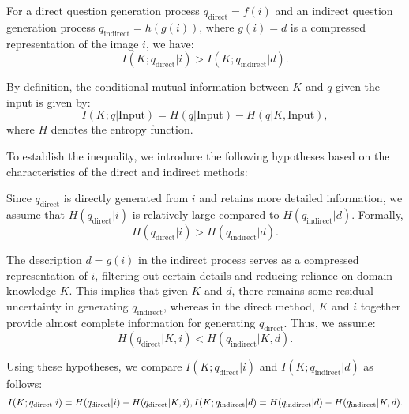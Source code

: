 \begin{lemma}
\label{lem:lemma1}
For a direct question generation process \( q_{\text{direct}} = f(i) \) and an indirect question generation process \( q_{\text{indirect}} = h(g(i)) \), where \( g(i) = d \) is a compressed representation of the image \( i \), we have:
\begin{equation}
I(K; q_{\text{direct}} | i) > I(K; q_{\text{indirect}} | d).
\end{equation}

By definition, the conditional mutual information between \( K \) and \( q \) given the input is given by:
\begin{equation}
I(K; q | \text{Input}) = H(q | \text{Input}) - H(q | K, \text{Input}),
\end{equation}
where \( H \) denotes the entropy function.

To establish the inequality, we introduce the following hypotheses based on the characteristics of the direct and indirect methods:

\begin{hypothesis1} Since \( q_{\text{direct}} \) is directly generated from \( i \) and retains more detailed information, we assume that \( H(q_{\text{direct}} | i) \) is relatively large compared to \( H(q_{\text{indirect}} | d) \). Formally,
\begin{equation}
   H(q_{\text{direct}} | i) > H(q_{\text{indirect}} | d).
\end{equation}
\end{hypothesis1}

\begin{hypothesis1}
 The description \( d = g(i) \) in the indirect process serves as a compressed representation of \( i \), filtering out certain details and reducing reliance on domain knowledge \( K \). This implies that given \( K \) and \( d \), there remains some residual uncertainty in generating \( q_{\text{indirect}} \), whereas in the direct method, \( K \) and \( i \) together provide almost complete information for generating \( q_{\text{direct}} \). Thus, we assume:
   \begin{equation}
   H(q_{\text{direct}} | K, i) < H(q_{\text{indirect}} | K, d).
   \end{equation}
\end{hypothesis1}

Using these hypotheses, we compare \( I(K; q_{\text{direct}} | i) \) and \( I(K; q_{\text{indirect}} | d) \) as follows:
\begin{equation}
I(K; q_{\text{direct}} | i) = H(q_{\text{direct}} | i) - H(q_{\text{direct}} | K, i),
\\ 
I(K; q_{\text{indirect}} | d) = H(q_{\text{indirect}} | d) - H(q_{\text{indirect}} | K, d).
\end{equation}


\end{lemma}
